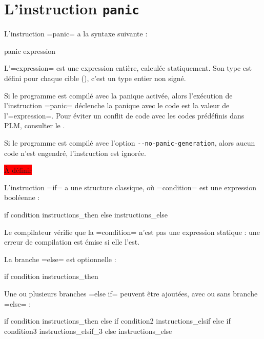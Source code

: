 \section{L'instruction \texttt{panic}}

L'instruction \plm=panic= a la syntaxe suivante :
\begin{PLM}
panic expression
\end{PLM}

L'\plm=expression= est une expression entière, calculée statiquement. Son type est défini pour chaque cible (), c'est un type entier non signé.

Si le programme est compilé avec la panique activée, alors l'exécution de l'instruction \plm=panic= déclenche la panique avec le code est la valeur de l'\plm=expression=. Pour éviter un conflit de code avec les codes prédéfinis dans PLM, consulter le .

Si le programme est compilé avec l'option \texttt{-{}-no-panic-generation}, alors aucun code n'est engendré, l'instruction est ignorée.





\colorbox{red}{À définir}



L'instruction \plm=if= a une structure classique, où \plm=condition= est une expression booléenne :
\begin{PLM}
if condition {
  instructions_then
}else{
  instructions_else
}
\end{PLM}

Le compilateur vérifie que la \plm=condition= n'est pas une expression statique : une erreur de compilation est émise si elle l'est.

La branche \plm=else= est optionnelle :
\begin{PLM}
if condition {
  instructions_then
}
\end{PLM}


Une ou plusieurs branches \plm=else if= peuvent être ajoutées, avec ou sans branche \plm=else= :
\begin{PLM}
if condition {
  instructions_then
}else if condition2 {
  instructions_elsif
}else if condition3 {
  instructions_elsif_3
}else{
  instructions_else
}
\end{PLM}


